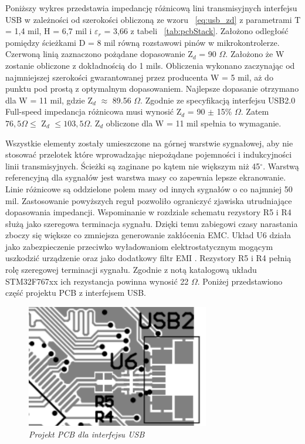 \documentclass[eng,printmode]{mgr}
\begin{document}
Poniższy wykres przedstawia impedancję różnicową lini transmisyjnych interfejsu USB w zależności od szerokości obliczoną ze wzoru ~\ref{eq:usb_zd} z parametrami T = 1,4 mil, H = 6,7 mil i \textbf{$\varepsilon_r$} = 3,66 z tabeli ~\ref{tab:pcbStack}. Założono odległość pomiędzy ścieżkami D = 8 mil równą rozstawowi pinów w mikrokontrolerze. Czerwoną linią zaznaczono pożądane dopasowanie Z$_d$ = 90 $\Omega$. Założono że W zostanie obliczone z dokładnością do 1 mils. Obliczenia wykonano zaczynając od najmniejszej szerokości gwarantowanej przez producenta W = 5 mil, aż do punktu pod prostą z optymalnym dopasowaniem. Najlepsze dopasanie otrzymano dla W = 11 mil, gdzie Z$_d$ $\approx$ 89.56 $\Omega$. Zgodnie ze specyfikacją interfejsu USB2.0 Full-speed impedancja różnicowa musi wynosić Z$_d$ = 90 $\pm$ 15\% $\Omega$.\cite{usbSpec} Zatem $ 76,5\Omega \leq$ Z$_d$ $\leq 103,5\Omega$. Z$_d$ obliczone dla W = 11 mil spełnia to wymaganie.

Wszystkie elementy zostały umieszczone na górnej warstwie sygnałowej, aby nie stosować przelotek które wprowadzając niepożądane pojemności i indukcyjności linii transmisyjnych. Ścieżki są zaginane po kątem nie większym niż 45$^\circ$. Warstwą referencyjną dla sygnałów jest warstwa masy co zapewnia lepsze ekranowanie. Linie różnicowe są oddzielone polem masy od innych sygnałów o co najmniej 50 mil. Zastosowanie powyższych reguł pozwoliło ograniczyć zjawiska utrudniające dopasowania impedancji. Wspominanie w rozdziale schematu rezystory R5 i R4 służą jako szeregowa terminacja sygnału. Dzięki temu zabiegowi czasy narastania zboczy się większe co zmniejsza generowanie zakłócenia EMC. Układ U6 działa jako zabezpieczenie przeciwko wyładowaniom elektrostatycznym mogącym uszkodzić urządzenie oraz jako dodatkowy filtr EMI . Rezystory R5 i R4 pełnią rolę szeregowej terminacji sygnału. Zgodnie z notą katalogową układu STM32F767xx ich rezystancja powinna wynosić 22 \textbf{$\Omega$}. Poniżej przedstawiono część projektu PCB z interfejsem USB.

\begin{figure}[!h]
    \centering
    \includegraphics[width=8cm]{pcb/usb.png}
    \caption{\textit{Projekt PCB dla interfejsu USB}}
\end{figure}
\end{document}
